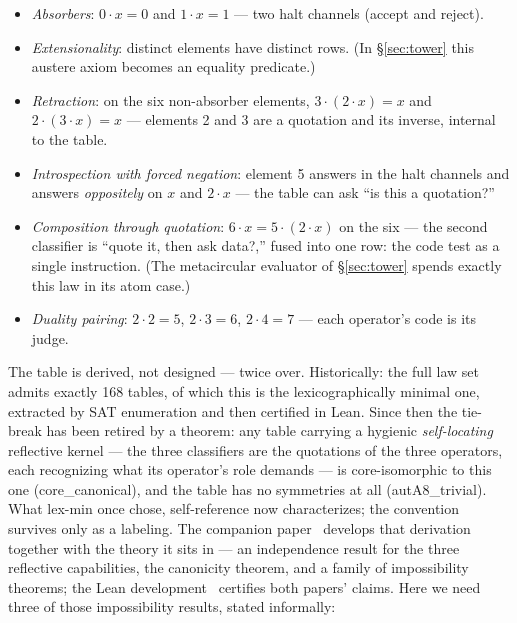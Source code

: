 \documentclass[acmsmall,screen,review]{acmart}
\begin{document}
\begin{itemize}
\item \emph{Absorbers}: $0 \cdot x = 0$ and $1 \cdot x = 1$ --- two
  halt channels (accept and reject).
\item \emph{Extensionality}: distinct elements have distinct rows.
  (In \S\ref{sec:tower} this austere axiom becomes an equality
  predicate.)
\item \emph{Retraction}: on the six non-absorber elements,
  $3 \cdot (2 \cdot x) = x$ and $2 \cdot (3 \cdot x) = x$ ---
  elements 2 and 3 are a quotation and its inverse, internal to the
  table.
\item \emph{Introspection with forced negation}: element 5 answers in
  the halt channels and answers \emph{oppositely} on $x$ and
  $2 \cdot x$ --- the table can ask ``is this a quotation?''
\item \emph{Composition through quotation}: $6 \cdot x = 5 \cdot
  (2 \cdot x)$ on the six --- the second classifier is ``quote it,
  then ask \textsf{data?},'' fused into one row: the code test as a
  single instruction. (The metacircular evaluator of
  \S\ref{sec:tower} spends exactly this law in its atom case.)
\item \emph{Duality pairing}: $2 \cdot 2 = 5$, $2 \cdot 3 = 6$,
  $2 \cdot 4 = 7$ --- each operator's code is its judge.
\end{itemize}

The table is derived, not designed --- twice over. Historically: the
full law set admits exactly 168 tables, of which this is the
lexicographically minimal one, extracted by SAT enumeration and then
certified in Lean. Since then the tie-break has been retired by a
theorem: any table carrying a hygienic \emph{self-locating}
reflective kernel --- the three classifiers are the quotations of
the three operators, each recognizing what its operator's role
demands --- is core-isomorphic to this one
(\textsf{core\_canonical}), and the table has no symmetries at all
(\textsf{autA8\_trivial}). What lex-min once chose, self-reference
now characterizes; the convention survives only as a labeling. The
companion paper~\cite{companion-paper} develops that derivation
together with the theory it sits in --- an independence result for
the three reflective capabilities, the canonicity theorem, and a
family of impossibility theorems; the Lean
development~\cite{artifact-lean} certifies both papers' claims. Here
we need three of those impossibility results, stated informally:
\end{document}
